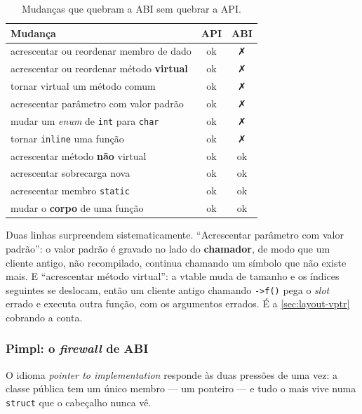 \begin{table}[htbp]
\centering
\caption{Mudanças que quebram a ABI sem quebrar a API.}
\label{tab:abi-quebras}
\footnotesize
\begin{tabular}{@{}lcc@{}}
\toprule
\textbf{Mudança} & \textbf{API} & \textbf{ABI} \\
\midrule
acrescentar ou reordenar membro de dado          & ok & ✗ \\
acrescentar ou reordenar método \textbf{virtual} & ok & ✗ \\
tornar virtual um método comum                   & ok & ✗ \\
acrescentar parâmetro com valor padrão           & ok & ✗ \\
mudar um \emph{enum} de \texttt{int} para \texttt{char} & ok & ✗ \\
tornar \texttt{inline} uma função                & ok & ✗ \\
\midrule
acrescentar método \textbf{não} virtual          & ok & ok \\
acrescentar sobrecarga nova                      & ok & ok \\
acrescentar membro \texttt{static}               & ok & ok \\
mudar o \textbf{corpo} de uma função             & ok & ok \\
\bottomrule
\end{tabular}
\end{table}

Duas linhas surpreendem sistematicamente. ``Acrescentar parâmetro com valor
padrão'': o valor padrão é gravado no lado do \textbf{chamador}, de modo que um
cliente antigo, não recompilado, continua chamando um símbolo que não existe
mais. E ``acrescentar método virtual'': a vtable muda de tamanho e os índices
seguintes se deslocam, então um cliente antigo chamando \texttt{->f()} pega o
\emph{slot} errado e executa outra função, com os argumentos errados. É a
\cref{sec:layout-vptr} cobrando a conta.

\subsubsection{Pimpl: o \emph{firewall} de ABI}

O idioma \emph{pointer to implementation} responde às duas pressões de uma vez:
a classe pública tem um único membro --- um ponteiro --- e tudo o mais vive numa
\texttt{struct} que o cabeçalho nunca vê.

